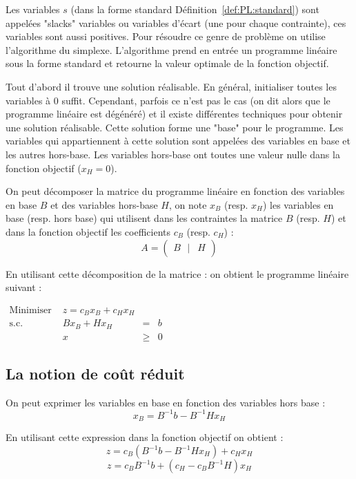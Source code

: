 Les variables $s$ (dans la forme standard Définition~\ref{def:PL:standard}) sont appelées  "slacks" variables ou variables d'écart (une pour chaque contrainte), ces variables sont aussi positives.
Pour résoudre ce genre de problème on utilise l'algorithme du simplexe. L'algorithme prend en entrée un programme linéaire sous la forme standard et retourne la valeur optimale de la fonction objectif. 

Tout d'abord il trouve une solution réalisable. En général, initialiser toutes les variables à 0 suffit. Cependant, parfois ce n'est pas le cas (on dit alors que le programme linéaire est dégénéré) et il existe différentes techniques pour obtenir une solution réalisable.
Cette solution forme une "base" pour le programme.
Les variables qui appartiennent à cette solution sont appelées des variables en base et les autres hors-base.
Les variables hors-base ont toutes une valeur nulle dans la fonction objectif ($x_H=0$). 

On peut décomposer la matrice du programme linéaire en fonction des variables en base $B$ et des variables hors-base $H$, on note $x_B$ (resp. $x_H$) les variables en base (resp. hors base) qui utilisent dans les contraintes la matrice $B$ (resp. $H$) et dans la fonction objectif les coefficients $c_B$ (resp. $c_H$) :
$$A = 
\begin{pmatrix} 
B~ ~~|& H 
\end{pmatrix}$$

En utilisant cette décomposition de la matrice : on obtient le programme linéaire suivant :
 
\begin{table}[H]
\begin{center}
$
\begin{array}{llll}
\text{Minimiser } & z = c_{B}x_B+c_{H}x_H\\
\text{s.c. } & Bx_{B}+Hx_{H} & = & b \\
& x & \geq & 0
\end{array}
$
\end{center}
\end{table}
\subsection{La notion de coût réduit \label{subsec:CR}}
On peut exprimer les variables en base en fonction des variables hors base :
$$
x_B = B^{-1}b - B^{-1}Hx_H
$$

En utilisant cette expression dans la fonction objectif on obtient :
$$
z = c_B(B^{-1}b - B^{-1}Hx_H) + c_Hx_H
$$
$$
z = c_BB^{-1}b + (c_H - c_BB^{-1}H)x_H
$$

